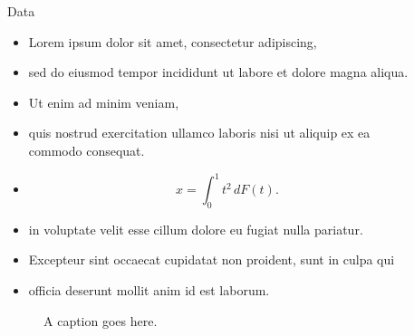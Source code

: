 \documentclass[12pt, final]{beamer}
\newlength{\sepwid}
\newlength{\onecolwid}
\newlength{\twocolwid}
\begin{document}
\begin{frame}[t]
\begin{columns}[t]
\begin{column}{\onecolwid}
    \end{column}
    \begin{column}{\sepwid}\end{column}
    \begin{column}{\twocolwid}
      \begin{block}{Data}
        \begin{itemize}
          \item Lorem ipsum \alert{dolor} sit amet, consectetur adipiscing,
          \item sed do eiusmod tempor incididunt ut labore et dolore magna aliqua.
          \item Ut enim ad minim veniam,
          \item quis nostrud exercitation ullamco laboris nisi ut aliquip ex ea commodo consequat.
          \item $$x = \int_0^1 t^2 \,dF(t).$$
          \item in voluptate velit \alert{esse cillum dolore} eu fugiat nulla pariatur.
          \item Excepteur sint occaecat cupidatat non proident, sunt in culpa qui
          \item officia deserunt mollit anim id est laborum.
        \end{itemize}
        \vskip1in
        \begin{figure}
          \label{fig:pic}
          \caption{A caption goes here.}
        \end{figure}
      \end{block}


\end{column}
\end{columns}
\end{frame}
\end{document}
